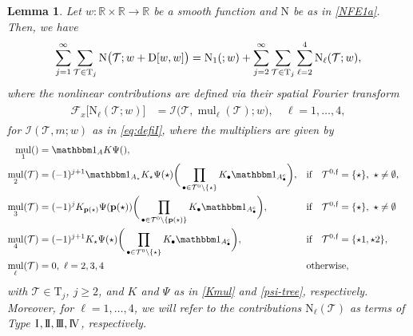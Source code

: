 \documentclass[a4paper,
11pt,  reqno]{amsart}
\makeatletter
\newcommand{\I}{\hspace{0.2mm}\textup{I}\hspace{0.2mm}}
\newcommand{\II}{\textup{I \hspace{-2.9mm} I} }
\newcommand{\III}{\textup{I \hspace{-2.9mm} I \hspace{-2.9mm} I}}
\newcommand{\IV}{\textup{I \hspace{-2.9mm} V}}
\newcommand{\5}{\textup{V}}
\newcommand{\ind}{\mathbbm 1}
\newtheorem{lemma}[theorem]{Lemma}
\theoremstyle{remark}
\newcommand{\R}{\mathbb{R}}
\newcommand{\bul}{\bullet}
\newcommand{\TT}{\mathcal{T}}
\newcommand{\Tr}{\mathrm{T}}
\newcommand{\pb}{\mathbf{p}}
\newcommand{\Ft}{{\mathcal{F}}}
\renewcommand{\l}{\ell}
\newcommand{\ff}{\mathfrak{f}}
\DeclareMathOperator{\mul}{mul}
\def\<#1>{\csname MH@symb@#1\endcsname}
\newcommand{\Ical}{\mathcal{I}}
\numberwithin{equation}{section}
\numberwithin{theorem}{section}
\newcommand{\NN}{\mathrm{N}}
\newcommand{\D}{\mathrm{D}}
\makeatother
\begin{document}
\begin{lemma}
\label{LEM:wint}
Let $w:\R \times \R\to \R$ be a smooth function and $\NN$ be as in \eqref{NFE1a}.
Then, we have
\begin{align}
\label{wint0a}
\sum_{j=1}^\infty \sum_{\TT\in \Tr_j} \NN\big(\TT; w+
\D[w, w]
\big)
=
\NN_1(\<1>;w) + \sum_{j=2}^\infty \sum_{\TT\in\Tr_j} \sum_{\ell=2}^4  \NN_\ell(\TT; w),
\end{align}
where the nonlinear contributions are defined via their spatial Fourier transform
\begin{align}
\label{wint0b}
\begin{split}
\Ft_x \big[ \NN_\ell (\TT; w) \big] & =
\Ical \big(\TT, {\mul}_\l(\TT); w \big),\quad \l=1,\dots, 4,
\end{split}
\end{align}
for $\Ical(\TT, m; w)$ as in \eqref{eq:defiI},
where the multipliers are given by
\begin{align}
    \mul_1(\<1>)&= \ind_A K \Psi(\<1>),\\
    \mul_2(\TT)&=(-1)^{j+1} \ind_{A_\star} K_\star\Psi(\star) \bigg( \prod_{\bul \in \TT^0 \setminus\{\star\}}  K_\bul  \ind_{A_\bul^c} \bigg),
    && \text{if} \quad  \TT^{0,\ff} = \{\star\}, \ \star\neq \emptyset,
    \\
    \mul_3(\TT)&=(-1)^{j}  K_{\pb(\star)}\Psi(\pb(\star)) \bigg( \prod_{\bul \in \TT^0 \setminus\{\pb(\star)\}}  K_\bul  \ind_{A_\bul^c} \bigg),
    &&
    \text{if} \quad  \TT^{0,\ff} = \{\star\},  \ \star\neq \emptyset
    \label{wint0c}
    \\
     \mul_4(\TT)&=(-1)^{j+1}  K_\star\Psi(\star) \bigg( \prod_{\bul \in \TT^0 \setminus\{\star\}}  K_\bul  \ind_{A_\bul^c} \bigg),
    && \text{if} \quad  \TT^{0,\ff} = \{\star1, \star2\},
    \\
    \mul_{\l}(\TT) & = 0, \ \l=2,3,4 && \text{otherwise},
\end{align}
with $\TT\in \Tr_j$,  $j \ge 2$, and $K$ and $\Psi$ as in \eqref{Kmul} and \eqref{psi-tree}, respectively.
Moreover, for $\l=1,\ldots, 4$, we will refer to the contributions $\NN_\l(\TT) $ as terms of Type $\I,\II,\III,\IV$, respectively.



\end{lemma}
\end{document}

